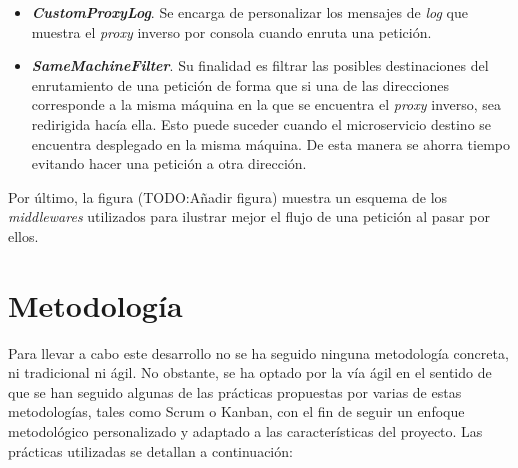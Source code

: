 \documentclass[11pt,spanish,listoffigures]{tfgetsinf}
\begin{document}
\begin{itemize}

	\item \textbf{\emph{CustomProxyLog}}. Se encarga de personalizar los mensajes de \emph{log} que muestra el \emph{proxy} inverso por consola cuando enruta una petición.

	\item \textbf{\emph{SameMachineFilter}}. Su finalidad es filtrar las posibles destinaciones del enrutamiento de una petición de forma que si una de las direcciones corresponde a la misma máquina en la que se encuentra el \emph{proxy} inverso, sea redirigida hacía ella. Esto puede suceder cuando el microservicio destino se encuentra desplegado en la misma máquina. De esta manera se ahorra tiempo evitando hacer una petición a otra dirección.

\end{itemize}

Por último, la figura (TODO:Añadir figura) muestra un esquema de los \emph{middlewares} utilizados para ilustrar mejor el flujo de una petición al pasar por ellos.



	\section{Metodología} \label{metodologia}

Para llevar a cabo este desarrollo no se ha seguido ninguna metodología concreta, ni tradicional ni ágil. No obstante, se ha optado por la vía ágil en el sentido de que se han seguido algunas de las prácticas propuestas por varias de estas metodologías, tales como Scrum o Kanban, con el fin de seguir un enfoque metodológico personalizado y adaptado a las características del proyecto. Las prácticas utilizadas se detallan a continuación:
\end{document}

